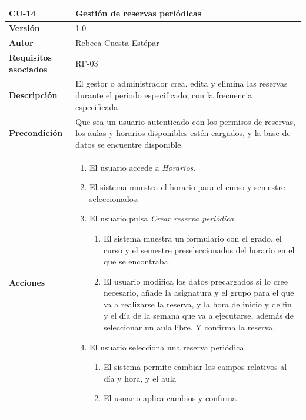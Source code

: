 \begin{table}[p]
	\centering
	\begin{tabularx}{\linewidth}{ p{} p{} }
		\toprule
		\textbf{CU-14}    & \textbf{Gestión de reservas periódicas}\\
		\toprule
		\textbf{Versión}              & 1.0    \\
		\textbf{Autor}                & Rebeca Cuesta Estépar \\
		\textbf{Requisitos asociados} & RF-03 \\
		\textbf{Descripción}          & El gestor o administrador crea, edita y elimina las reservas durante el periodo especificado, con la frecuencia especificada.  \\
		\textbf{Precondición}         & Que sea un usuario autenticado con los permisos de reservas, los aulas y horarios disponibles estén cargados, y la base de datos se encuentre disponible.\\
		\textbf{Acciones}             &
		\begin{enumerate}
			\def\labelenumi{\arabic{enumi}.}
			\tightlist
			\item El usuario accede a \emph{Horarios}.
			\item El sistema muestra el horario para el curso y semestre seleccionados.
			\item El usuario pulsa \emph{Crear reserva periódica}.
			\begin{enumerate}[label*=\arabic*., itemsep=0.5pt, topsep=0.5pt, leftmargin=1em]
				\tightlist
				\item El sistema muestra un formulario con el grado, el curso y el semestre preseleccionados del horario en el que se encontraba.
				\item El usuario modifica los datos precargados si lo cree necesario, añade la asignatura y el grupo para el que va a realizarse la reserva, y la hora de inicio y de fin y el día de la semana que va a ejecutarse, además de seleccionar un aula libre. Y confirma la reserva.
			\end{enumerate}
			\item El usuario selecciona una reserva periódica
			\begin{enumerate}[label*=\arabic*., itemsep=0.5pt, topsep=0.5pt, leftmargin=1em]
				\tightlist
				\item El sistema permite cambiar los campos relativos al día y hora, y el aula
				\item El usuario aplica cambios y confirma 
			\end{enumerate}

\end{enumerate}
\end{tabularx}
\end{table}
